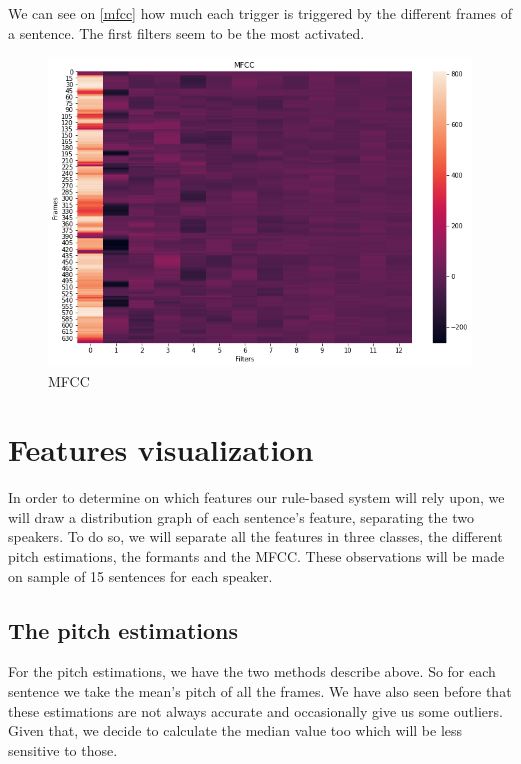 \documentclass[]{article}
\begin{document}
We can see on \autoref{mfcc} how much each trigger is triggered by the different frames
of a sentence. The first filters seem to be the most activated.

\begin{figure}[H]
    \centering
    \caption{\label{mfcc}MFCC}
    \includegraphics[scale=0.5]{images/mfcc.png}
\end{figure}


\section{Features visualization}

In order to determine on which features our rule-based system will rely upon, we will draw a
distribution graph of each sentence's feature, separating the two speakers. To do so, we will separate all
the features in three classes, the different pitch estimations, the formants and
the MFCC. These observations will be made on sample of
15 sentences for each speaker.

\subsection{The pitch estimations}

For the pitch estimations, we have the two methods describe above. So for each sentence 
we take the mean's pitch of all the frames. We have also seen before that these estimations are
not always accurate and occasionally give us some outliers. Given that, we decide to calculate
the median value too which will be less sensitive to those.
\end{document}
